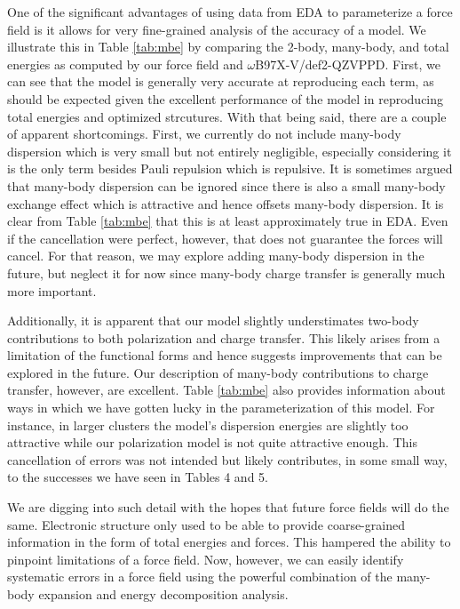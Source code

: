 \documentclass[12pt,letter]{article}
\begin{document}
One of the significant advantages of using data from EDA to parameterize a
force field is it allows for very fine-grained analysis of the accuracy of a model.
We illustrate this in Table \ref{tab:mbe} by comparing the 2-body, many-body, and total
energies as computed by our force field and $\omega$B97X-V/def2-QZVPPD. First, we can see
that the model is generally very accurate at reproducing each term, as should be expected
given the excellent performance of the model in reproducing total energies and optimized
strcutures. With that being said, there are a couple of apparent shortcomings. First,
we currently do not include many-body dispersion which is very small but not entirely
negligible, especially considering it is the only term besides Pauli repulsion which is
repulsive. It is sometimes argued that many-body dispersion can be ignored since there is
also a small many-body exchange effect which is attractive and hence offsets many-body
dispersion. It is clear from Table \ref{tab:mbe} that this is at least
approximately true in EDA. Even if the cancellation were perfect, however, that does
not guarantee the forces will cancel. For that reason, we may explore adding many-body
dispersion in the future, but neglect it for now since many-body charge transfer
is generally much more important.

Additionally, it is apparent that our model slightly understimates two-body contributions
to both polarization and charge transfer. This likely arises from a limitation of the
functional forms and hence suggests improvements that can be explored in the future.
Our description of many-body contributions to charge transfer, however, are excellent.
Table \ref{tab:mbe} also provides information about ways in which we have gotten lucky
in the parameterization of this model. For instance, in larger clusters the model's dispersion
energies are slightly too attractive while our polarization model is not quite attractive
enough. This cancellation of errors was not intended but likely contributes, in some small
way, to the successes we have seen in Tables 4 and 5.

We are digging into such detail with the hopes that future force fields will do the same.
Electronic structure only used to be able to provide coarse-grained information in the form
of total energies and forces. This hampered the ability to pinpoint limitations of a force field.
Now, however, we can easily identify systematic errors in a force field using the powerful
combination of the many-body expansion and energy decomposition analysis.



    
\end{document}
